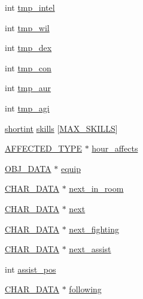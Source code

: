 \begin{DoxyCompactItemize}
\item 
int \hyperlink{structchar__data_a266de5b18ad35c83f265f787315dc3d3}{tmp\-\_\-intel}
\item 
int \hyperlink{structchar__data_a7a4e2674da8298129831698ec10e1073}{tmp\-\_\-wil}
\item 
int \hyperlink{structchar__data_a2e9ca17339053a00ce476cab368c3a73}{tmp\-\_\-dex}
\item 
int \hyperlink{structchar__data_ac6d62bdb3183e73bd200b03a391ee0f2}{tmp\-\_\-con}
\item 
int \hyperlink{structchar__data_aff6d779548ab277daf8d871a7a0eb17b}{tmp\-\_\-aur}
\item 
int \hyperlink{structchar__data_aaf43a5d1d6e5881ce64618471c519d78}{tmp\-\_\-agi}
\item 
\hyperlink{structs_8h_a083f081df8f705562c500e016f338096}{shortint} \hyperlink{structchar__data_a4df8d97fcd32b649d3072e6fe668d0ce}{skills} \mbox{[}\hyperlink{structs_8h_a4e56530a094cfb02145de1378db9cd6d}{M\-A\-X\-\_\-\-S\-K\-I\-L\-L\-S}\mbox{]}
\item 
\hyperlink{structs_8h_a0a9304fc5764d8448c93fdffdd64e1d2}{A\-F\-F\-E\-C\-T\-E\-D\-\_\-\-T\-Y\-P\-E} $\ast$ \hyperlink{structchar__data_abc0edde73e6222c8555e331143f60dae}{hour\-\_\-affects}
\item 
\hyperlink{structs_8h_aaa59141dfc8c6ecdb6bfcf1537dd52d1}{O\-B\-J\-\_\-\-D\-A\-T\-A} $\ast$ \hyperlink{structchar__data_a984b89a9e4e76e6cc2c50ecd11498589}{equip}
\item 
\hyperlink{structs_8h_af33ed1e66e8541a08bed257124f50f31}{C\-H\-A\-R\-\_\-\-D\-A\-T\-A} $\ast$ \hyperlink{structchar__data_adebab647c1fc9e643df50a02f9b63d31}{next\-\_\-in\-\_\-room}
\item 
\hyperlink{structs_8h_af33ed1e66e8541a08bed257124f50f31}{C\-H\-A\-R\-\_\-\-D\-A\-T\-A} $\ast$ \hyperlink{structchar__data_a6ef304ae5efc90bc8c2d21e4f7364b84}{next}
\item 
\hyperlink{structs_8h_af33ed1e66e8541a08bed257124f50f31}{C\-H\-A\-R\-\_\-\-D\-A\-T\-A} $\ast$ \hyperlink{structchar__data_a77300f4eb2e5da912007c891af31654b}{next\-\_\-fighting}
\item 
\hyperlink{structs_8h_af33ed1e66e8541a08bed257124f50f31}{C\-H\-A\-R\-\_\-\-D\-A\-T\-A} $\ast$ \hyperlink{structchar__data_ab5c5855b87c035a60d1a8795a15a86bd}{next\-\_\-assist}
\item 
int \hyperlink{structchar__data_ab6e65f98ac987ce0e62a937490c1679a}{assist\-\_\-pos}
\item 
\hyperlink{structs_8h_af33ed1e66e8541a08bed257124f50f31}{C\-H\-A\-R\-\_\-\-D\-A\-T\-A} $\ast$ \hyperlink{structchar__data_a02243ccd448a23cdc383f4d9b7913b70}{following}

\end{DoxyCompactItemize}
